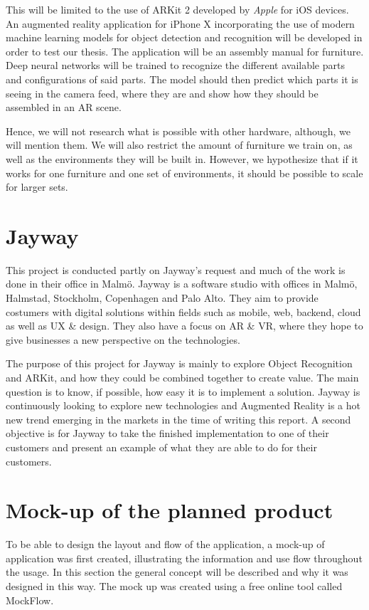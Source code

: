 This will be limited to the use of ARKit 2 developed by \textit{Apple} for iOS devices. An augmented reality application for iPhone X incorporating the use of modern machine learning models for object detection and recognition will be developed in order to test our thesis. The application will be an assembly manual for furniture. Deep neural networks will be trained to recognize the different available parts and configurations of said parts.  The model should then predict which parts it is seeing in the camera feed, where they are and show how they should be assembled in an AR scene. 

Hence, we will not research what is possible with other hardware, although, we will mention them. We will also restrict the amount of furniture we train on, as well as the environments they will be built in. However, we hypothesize that if it works for one furniture and one set of environments, it should be possible to scale for larger sets.


\section{Jayway}
\label{subSecJayway}
This project is conducted partly on Jayway's request and much of the work is done in their office in Malmö.
Jayway is a software studio with offices in Malmö, Halmstad, Stockholm, Copenhagen and Palo Alto. They aim to provide costumers with digital solutions  within fields such as mobile, web, backend, cloud as well as UX \& design. They also have a focus on AR \& VR, where they hope to give businesses a new perspective on the technologies.


The purpose of this project for Jayway is mainly to explore Object Recognition  and ARKit, and how they could be combined together to create value. The main question is to know, if possible, how easy it is to implement a solution.
Jayway is continuously looking to explore new technologies and Augmented Reality is a hot new trend emerging in the markets in the time of writing this report.
A second objective is for Jayway to take the finished implementation to one of their customers and
present an example of what they are able to do for their customers.

\section{Mock-up of the planned product}
\label{subSecMockup}
To be able to design the layout and flow of the application, a mock-up of application was first created, illustrating the information and use flow throughout the usage. In this section the general concept will be described and why it was designed in this way. The mock up was created using a free online tool called MockFlow\cite{mockflow}. 

